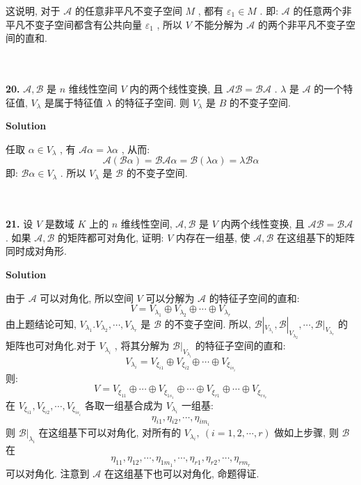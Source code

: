 \documentclass[11pt,a4paper,openany,oneside]{book}
\newcommand\Solution{\noindent\textbf{\textsf{Solution}}\par\medskip}
\begin{document}
这说明, 对于 $ \mathcal{A} $ 的任意非平凡不变子空间 $ M $ , 都有 $ \varepsilon_1 \in M $ . 即:  $ \mathcal{A} $ 的任意两个非平凡不变子空间都含有公共向量 $ \varepsilon_1 $ , 所以 $ V $ 不能分解为 $ \mathcal{A} $ 的两个非平凡不变子空间的直和.  \\  \\  \\


\begin{myexample}
	\textbf{20.} $ \mathcal{A}, \mathcal{B} $ 是 $ n $ 维线性空间 $ V $ 内的两个线性变换, 且 $ \mathcal{AB} = \mathcal{BA} $ . $ \lambda $ 是 $ \mathcal{A} $ 的一个特征值,  $ V_{\lambda} $ 是属于特征值 $ \lambda $ 的特征子空间. 则 $ V_{\lambda} $ 是 $ B $ 的不变子空间.
\end{myexample}
\Solution

任取 $ \alpha \in V_{\lambda} $ , 有 $ \mathcal{A}\alpha = \lambda\alpha $ , 从而:
 $$   \mathcal{A}(\mathcal{B}\alpha)  = \mathcal{BA}\alpha = \mathcal{B}(\lambda \alpha)  = \lambda\mathcal{B}\alpha  $$ 
即:  $ \mathcal{B}\alpha \in V_{\lambda} $ . 所以 $ V_{\lambda} $ 是 $ \mathcal{B} $ 的不变子空间.\\  \\  \\


\begin{myexample}
	\textbf{21.} 设 $ V $ 是数域 $ K $ 上的 $ n $ 维线性空间,  $ \mathcal{A}, \mathcal{B} $ 是 $ V $ 内两个线性变换, 且 $ \mathcal{AB}=\mathcal{BA} $ . 如果 $ \mathcal{A}, \mathcal{B} $ 的矩阵都可对角化, 证明: $ V $ 内存在一组基, 使 $ \mathcal{A},\mathcal{B} $ 在这组基下的矩阵同时成对角形. 
\end{myexample}
\Solution

由于 $ \mathcal{A} $ 可以对角化, 所以空间 $ V $ 可以分解为 $ \mathcal{A} $ 的特征子空间的直和:
 $$   V = V_{\lambda_1} \oplus  V_{\lambda_2} \oplus  \cdots \oplus  V_{\lambda_r}  $$ 
由上题结论可知,  $ V_{\lambda_1}. V_{\lambda_2}, \cdots, V_{\lambda_r} $ 是 $ \mathcal{B} $ 的不变子空间. 所以,  $ \mathcal{B}|_{V_{\lambda_1}}, \mathcal{B}|_{V_{\lambda_2}}, \cdots, \mathcal{B}|_{V_{\lambda_r}} $ 的矩阵也可对角化.对于 $ V_{\lambda_i} $ , 将其分解为 $ \mathcal{B}|_{V_{\lambda_i}} $ 的特征子空间的直和:
 $$  V_{\lambda_i} = V_{\xi_{i1}} \oplus  V_{\xi_{i2}} \oplus  \cdots \oplus  V_{\xi_{is_i}}  $$ 
则:
 $$  V = V_{\xi_{11}} \oplus  \cdots \oplus  V_{\xi_{1s_1}} \oplus  \cdots \oplus  V_{\xi_{r1}} \oplus  \cdots \oplus  V_{\xi_{rs_r}}  $$ 
在  $ V_{\xi_{i1}},  V_{\xi_{i2}},  \cdots , V_{\xi_{is_i}} $ 各取一组基合成为 $ V_{\lambda_i} $ 一组基:
 $$  \eta_{i1}, \eta_{i2}, \cdots, \eta_{im_i}  $$  
则 $ \mathcal{B}|_{\lambda_i} $ 在这组基下可以对角化, 对所有的 $ V_{\lambda_i}, \ (i=1, 2, \cdots, r) $ 做如上步骤, 则 $ \mathcal{B} $ 在
 $$  \eta_{11}, \eta_{12}, \cdots, \eta_{1m_1}, \cdots, \eta_{r1}, \eta_{r2}, \cdots, \eta_{rm_r}  $$  
可以对角化. 注意到 $ \mathcal{A} $ 在这组基下也可以对角化, 命题得证.  \\  \\  
\end{document}
